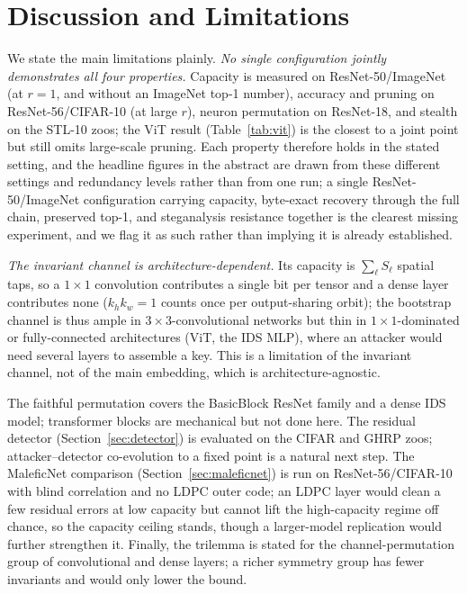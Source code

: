 \documentclass[a4paper,fleqn]{cas-dc}
\theoremstyle{plain}
\theoremstyle{remark}
\begin{document}
\section{Discussion and Limitations}\label{sec:disc}
We state the main limitations plainly. \emph{No single configuration jointly demonstrates
all four properties.} Capacity is measured on ResNet-50/ImageNet (at $r{=}1$, and without an
ImageNet top-1 number), accuracy and pruning on ResNet-56/CIFAR-10 (at large $r$), neuron
permutation on ResNet-18, and stealth on the STL-10 zoos; the ViT result
(Table~\ref{tab:vit}) is the closest to a joint point but still omits large-scale pruning.
Each property therefore holds in the stated setting, and the headline figures in the abstract
are drawn from these different settings and redundancy levels rather than from one run; a
single ResNet-50/ImageNet configuration carrying capacity, byte-exact recovery through the full
chain, preserved top-1, and steganalysis resistance together is the clearest missing experiment,
and we flag it as such rather than implying it is already established.

\emph{The invariant channel is architecture-dependent.} Its capacity is $\sum_\ell S_\ell$
spatial taps, so a $1\times1$ convolution contributes a single bit per tensor and a dense layer
contributes none ($k_h k_w=1$ counts once per output-sharing orbit); the bootstrap channel is
thus ample in $3\times3$-convolutional networks but thin in $1\times1$-dominated or
fully-connected architectures (ViT, the IDS MLP), where an attacker would need several layers to
assemble a key. This is a limitation of the invariant channel, not of the main embedding, which
is architecture-agnostic.

The faithful permutation covers the BasicBlock ResNet family and a dense IDS model;
transformer blocks are mechanical but not done here. The residual detector
(Section~\ref{sec:detector}) is evaluated on the CIFAR and GHRP zoos; attacker--detector
co-evolution to a fixed point is a natural next step. The MaleficNet comparison
(Section~\ref{sec:maleficnet}) is run on ResNet-56/CIFAR-10 with blind correlation and no LDPC
outer code; an LDPC layer would clean a few residual errors at low capacity but cannot lift the
high-capacity regime off chance, so the capacity ceiling stands, though a larger-model
replication would further strengthen it. Finally, the trilemma is stated for the
channel-permutation group of convolutional and dense layers; a richer symmetry group has fewer
invariants and would only lower the bound.
\end{document}
